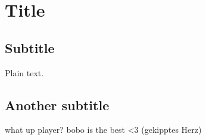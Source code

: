 \documentclass{article}
\begin{document}
\section{Title}

\subsection{Subtitle}

Plain text.

\subsection{Another subtitle}

what up player?
bobo is the best <3 (gekipptes Herz)
\end{document}

